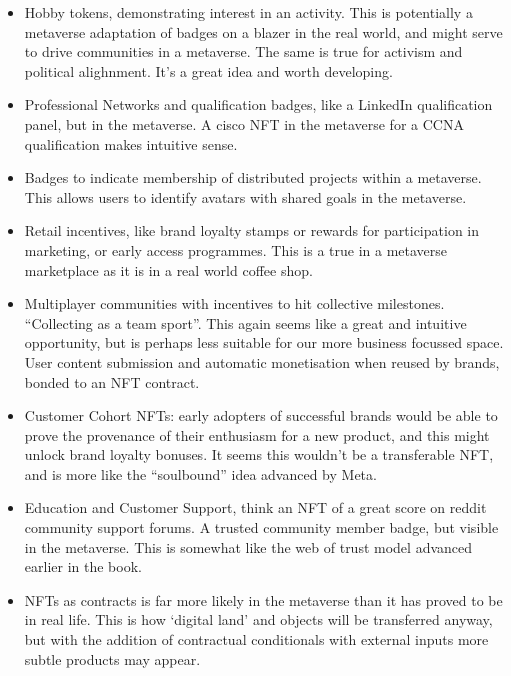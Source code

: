 \begin{itemize}
\item Hobby tokens, demonstrating interest in an activity. This is potentially a metaverse adaptation of badges on a blazer in the real world, and might serve to drive communities in a metaverse. The same is true for activism and political alighnment. It's a great idea and worth developing.
\item Professional Networks and qualification badges, like a LinkedIn qualification panel, but in the metaverse. A cisco NFT in the metaverse for a CCNA qualification makes intuitive sense. 
\item Badges to indicate membership of distributed projects within a metaverse. This allows users to identify avatars with shared goals in the metaverse.
\item Retail incentives, like brand loyalty stamps or rewards for participation in marketing, or early access programmes. This is a true in a metaverse marketplace as it is in a real world coffee shop.
\item Multiplayer communities with incentives to hit collective milestones. ``Collecting as a team sport''. This again seems like a great and intuitive opportunity, but is perhaps less suitable for our more business focussed space.
User content submission and automatic monetisation when reused by brands, bonded to an NFT contract.
\item Customer Cohort NFTs: early adopters of successful brands would be able to prove the provenance of their enthusiasm for a new product, and this might unlock brand loyalty bonuses. It seems this wouldn't be a transferable NFT, and is more like the ``soulbound'' idea advanced by Meta.
\item Education and Customer Support, think an NFT of a great score on reddit community support forums. A trusted community member badge, but visible in the metaverse. This is somewhat like the web of trust model advanced earlier in the book.
\item NFTs as contracts is far more likely in the metaverse than it has proved to be in real life. This is how `digital land' and objects will be transferred anyway, but with the addition of contractual conditionals with external inputs more subtle products may appear.
\end{itemize}

